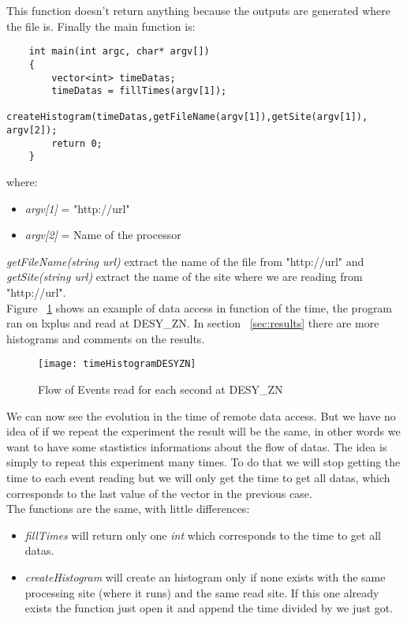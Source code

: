 This function doesn't return anything because the outputs are generated where the file is. Finally the main function is:

\begin{lstlisting}
	int main(int argc, char* argv[])
	{
		vector<int> timeDatas;
		timeDatas = fillTimes(argv[1]);
		createHistogram(timeDatas,getFileName(argv[1]),getSite(argv[1]), argv[2]);
		return 0;
	}
\end{lstlisting}

where:

\begin{itemize}
	\item \textit{argv[1]} = "http://url"
	\item \textit{argv[2]} = Name of the processor
\end{itemize}

\textit{getFileName(string url)} extract the name of the file from "http://url" and \textit{getSite(string url)} extract the name of the site where we are reading from "http://url".\\

Figure ~\ref{fig:timeHistogram} shows an example of data access in function of the time, the program ran on lxplus and read at DESY\_ZN. In section ~\ref{sec:results} there are more histograms and comments on the results.\\

\begin{figure}
	\texttt{[image: timeHistogramDESYZN]}
	\caption{Flow of Events read for each second at DESY\_ZN}
	\label{fig:timeHistogram}
\end{figure}


We can now see the evolution in the time of remote data access. But we have no idea of if we repeat the experiment the result will be the same, in other words we want to have some stastistics informations about the flow of datas. The idea is simply to repeat this experiment many times. To do that we will stop getting the time to each event reading but we will only get the time to get all datas, which corresponds to the last value of the vector in the previous case.\\

The functions are the same, with little differences:

\begin{itemize}
	\item \textit{fillTimes} will return only one \textit{int} which corresponds to the time to get all datas.\\
	\item \textit{createHistogram} will create an histogram only if none exists with the same processing site (where it runs) and the same read site. If this one already exists the function just open it and append the time divided by we just got. \\
\end{itemize}

